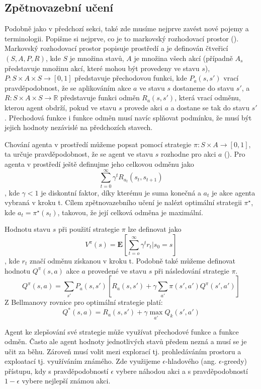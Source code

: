 \subsection{Zpětnovazební učení}
Podobně jako v předchozí sekci, také zde musíme nejprve zavést nové pojemy a terminologii.
Popišme si nejprve, co je to markovský rozhodovací prostor (\cite{markovDecisionProcesses}).
Markovský rozhodovací prostor popisuje prostředí a je definován čtveřicí $(S,A,P,R)$, kde $S$ je množina stavů, $A$ je množina všech akcí (případně $A_s$ představuje množinu akcí, které mohou být provedeny ve stavu $s$), 
$P: S \times A \times S \rightarrow [0,1]$ představuje přechodovou funkci, 
kde $P_a(s,s')$ vrací pravděpodobnost, že se aplikováním akce $a$ ve stavu $s$ dostaneme do stavu $s'$, 
a $R: S \times A \times S \rightarrow \mathbb{R}$ představuje funkci odměn $R_a(s,s')$, která vrací odměnu, kterou agent obdrží, pokud ve stavu $s$ provede akci $a$ a dostane se tak do stavu $s'$.
Přechodová funkce i funkce odměn musí navíc splňovat podmínku, že musí být jejich hodnoty nezávislé na předchozích stavech.


Chování agenta v prostředí můžeme popsat pomocí strategie $\pi: S \times A \rightarrow [0,1]$, ta určuje pravděpodobnost, že se agent ve stavu $s$ rozhodne pro akci $a$ (\cite{deepQ}).
Pro agenta v prostředí ještě definujme jeho celkovou odměnu jako \[\sum_{t=0}^{\infty} \gamma^tR_{a_t}(s_t,s_{t+1})\], kde $\gamma<1$ je diskontní faktor, díky kterému je suma konečná a $a_t$ je akce agenta vybraná v kroku t.
Cílem zpětnovazebního učení je nalézt optimální strategii $\pi^\star$, kde $a_t=\pi^\star(s_t)$, takovou, že její celková odměna je maximální.

Hodnotu stavu $s$ při použití strategie $\pi$ lze definovat jako 
\newline
\[V^{\pi}(s)=\mathbf{E}[\sum_{t=o}^{\infty} \gamma^tr_t|s_0=s]\], kde $r_t$ značí odměnu získanou v kroku t.
Podobně také můžeme definovat hodnotu $Q^{\pi}(s,a)$ akce $a$ provedené ve stavu $s$ při následování strategie $\pi$.
\[Q^\pi(s,a)=\sum_{s'}P_a(s,s')[R_a(s,s') + \gamma\sum_{a'} \pi(s',a')Q^\pi(s',a')]\]
Z Bellmanovy rovnice pro optimální strategie platí:
\[Q^*(s,a)=R_a(s,s') + \gamma\max_{a'}Q_k(s',a')\]

Agent ke zlepšování své strategie může využívat přechodové funkce a funkce odměn. Často ale agent hodnoty jednotlivých stavů předem nezná a musí se je učit za běhu.
Zároveň musí volit mezi explorací tj. prohledáváním prostoru a exploatací tj. využíváním známého. Zde využijeme $\epsilon$-hladového (ang. $\epsilon$-greedy) přístupu, kdy s pravděpodobností $\epsilon$ vybere náhodou akci a s pravděpodobností $1-\epsilon$ vybere nejlepší známou akci.

